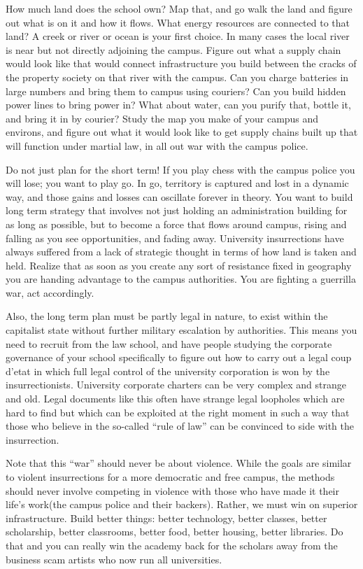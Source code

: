 How much land does the school own? Map that, and go walk the land and
figure out what is on it and how it flows. What energy resources are
connected to that land? A creek or river or ocean is your first choice.
In many cases the local river is near but not directly adjoining the
campus. Figure out what a supply chain would look like that would
connect infrastructure you build between the cracks of the property
society on that river with the campus. Can you charge batteries in large
numbers and bring them to campus using couriers? Can you build hidden
power lines to bring power in? What about water, can you purify that,
bottle it, and bring it in by courier? Study the map you make of your
campus and environs, and figure out what it would look like to get
supply chains built up that will function under martial law, in all out
war with the campus police.

Do not just plan for the short term! If you play chess with the campus
police you will lose; you want to play go. In go, territory is captured
and lost in a dynamic way, and those gains and losses can oscillate
forever in theory. You want to build long term strategy that involves
not just holding an administration building for as long as possible, but
to become a force that flows around campus, rising and falling as you
see opportunities, and fading away. University insurrections have always
suffered from a lack of strategic thought in terms of how land is taken
and held. Realize that as soon as you create any sort of resistance
fixed in geography you are handing advantage to the campus authorities.
You are fighting a guerrilla war, act accordingly.

Also, the long term plan must be partly legal in nature, to exist within
the capitalist state without further military escalation by authorities.
This means you need to recruit from the law school, and have people
studying the corporate governance of your school specifically to figure
out how to carry out a legal coup d'etat in which full legal control of
the university corporation is won by the insurrectionists. University
corporate charters can be very complex and strange and old. Legal
documents like this often have strange legal loopholes which are hard to
find but which can be exploited at the right moment in such a way that
those who believe in the so-called ``rule of law'' can be convinced to
side with the insurrection.

Note that this ``war'' should never be about violence. While the goals
are similar to violent insurrections for a more democratic and free
campus, the methods should never involve competing in violence with
those who have made it their life's work(the campus police and their
backers). Rather, we must win on superior infrastructure. Build better
things: better technology, better classes, better scholarship, better
classrooms, better food, better housing, better libraries. Do that and
you can really win the academy back for the scholars away from the
business scam artists who now run all universities.

